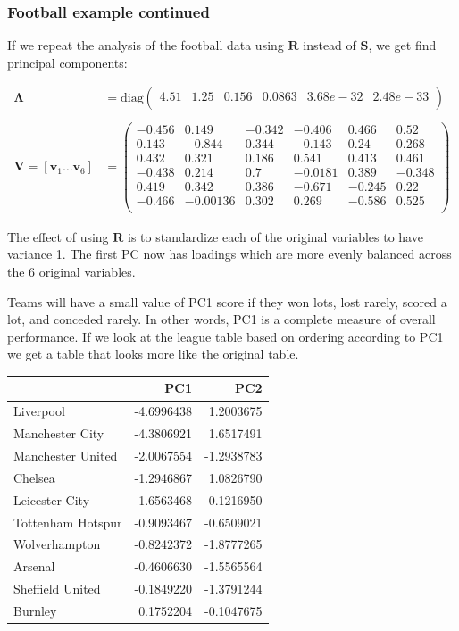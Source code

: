 \documentclass[]{book}
\theoremstyle{definition}
\theoremstyle{definition}
\theoremstyle{definition}
\theoremstyle{remark}
\begin{document}
\hypertarget{football-example-continued}{%
\subsubsection{Football example continued}\label{football-example-continued}}

If we repeat the analysis of the football data using \(\boldsymbol R\) instead of \(\boldsymbol S\), we get find principal components:

\begin{align*}
\boldsymbol \Lambda&= \text{diag}\begin{pmatrix}4.51&1.25&0.156&0.0863&3.68e-32&2.48e-33 \\\end{pmatrix}\\
\;\\
\boldsymbol V= [\boldsymbol v_1 \ldots \boldsymbol v_6] &=\begin{pmatrix}-0.456&0.149&-0.342&-0.406&0.466&0.52 \\0.143&-0.844&0.344&-0.143&0.24&0.268 \\0.432&0.321&0.186&0.541&0.413&0.461 \\-0.438&0.214&0.7&-0.0181&0.389&-0.348 \\0.419&0.342&0.386&-0.671&-0.245&0.22 \\-0.466&-0.00136&0.302&0.269&-0.586&0.525 \\\end{pmatrix}
\end{align*}

The effect of using \(\boldsymbol R\) is to standardize each of the original variables to have variance 1.
The first PC now has loadings which are more evenly balanced across the 6 original variables.

Teams will have a small value of PC1 score if they won lots, lost rarely, scored a lot, and conceded rarely. In other words, PC1 is a complete measure of overall performance. If we look at the league table based on ordering according to PC1 we get a table that looks more like the original table.

\begin{tabular}{lrr}
\toprule
  & PC1 & PC2\\
\midrule
Liverpool & -4.6996438 & 1.2003675\\
Manchester City & -4.3806921 & 1.6517491\\
Manchester United & -2.0067554 & -1.2938783\\
Chelsea & -1.2946867 & 1.0826790\\
Leicester City & -1.6563468 & 0.1216950\\
\addlinespace
Tottenham Hotspur & -0.9093467 & -0.6509021\\
Wolverhampton & -0.8242372 & -1.8777265\\
Arsenal & -0.4606630 & -1.5565564\\
Sheffield United & -0.1849220 & -1.3791244\\
Burnley & 0.1752204 & -0.1047675\\
\bottomrule
\end{tabular}
\end{document}

